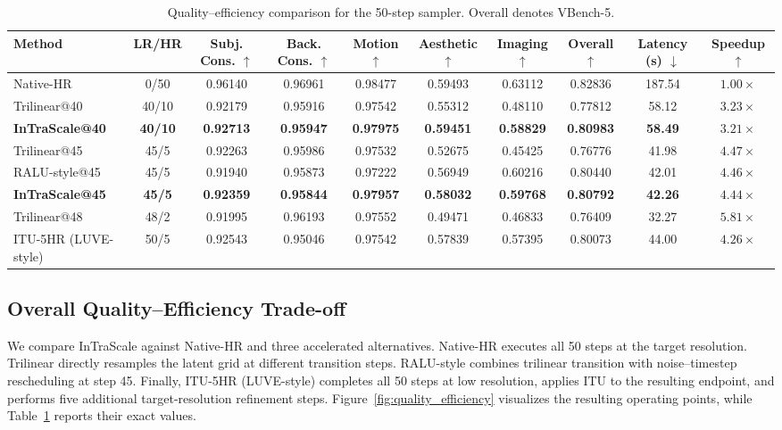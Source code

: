 \documentclass[letterpaper]{article} %
\begin{document}
\begin{table}[t]
  \centering
  \small
  \setlength{\tabcolsep}{1.0pt}
  \renewcommand{\arraystretch}{1.0}
  \begin{tabular}{@{}lccccccccc@{}}
    \toprule
    Method & LR/HR & Subj. Cons. \(\uparrow\) & Back. Cons. \(\uparrow\) &
    Motion \(\uparrow\) & Aesthetic \(\uparrow\) & Imaging \(\uparrow\) &
    Overall \(\uparrow\) & Latency (s) \(\downarrow\) & Speedup \(\uparrow\) \\
    \midrule
    Native-HR & 0/50 & 0.96140 & 0.96961 & 0.98477 & 0.59493 &
    0.63112 & 0.82836 & 187.54 & \(1.00\times\) \\
    Trilinear@40 & 40/10 & 0.92179 & 0.95916 & 0.97542 & 0.55312 &
    0.48110 & 0.77812 & 58.12 & \(3.23\times\) \\
    \textbf{InTraScale@40} & \textbf{40/10} & \textbf{0.92713} &
    \textbf{0.95947} & \textbf{0.97975} & \textbf{0.59451} &
    \textbf{0.58829} & \textbf{0.80983} & \textbf{58.49} &
    \(\mathbf{3.21\times}\) \\
    Trilinear@45 & 45/5 & 0.92263 & 0.95986 & 0.97532 & 0.52675 &
    0.45425 & 0.76776 & 41.98 & \(4.47\times\) \\
    RALU-style@45 & 45/5 & 0.91940 & 0.95873 & 0.97222 & 0.56949 &
    0.60216 & 0.80440 & 42.01 & \(4.46\times\) \\
    \textbf{InTraScale@45} & \textbf{45/5} & \textbf{0.92359} &
    \textbf{0.95844} & \textbf{0.97957} & \textbf{0.58032} &
    \textbf{0.59768} & \textbf{0.80792} & \textbf{42.26} &
    \(\mathbf{4.44\times}\) \\
    Trilinear@48 & 48/2 & 0.91995 & 0.96193 & 0.97552 & 0.49471 &
    0.46833 & 0.76409 & 32.27 & \(5.81\times\) \\
    ITU-5HR (LUVE-style) & 50/5 & 0.92543 & 0.95046 & 0.97542 &
    0.57839 & 0.57395 & 0.80073 & 44.00 & \(4.26\times\) \\
    \bottomrule
  \end{tabular}
  \caption{Quality--efficiency comparison for the 50-step sampler. Overall denotes VBench-5.}
  \label{tab:wan50_quality_efficiency}
\end{table}

\subsection{Overall Quality--Efficiency Trade-off}
\label{sec:quality_efficiency}

We compare InTraScale against Native-HR and three accelerated alternatives.
Native-HR executes all 50 steps at the target resolution. Trilinear
directly resamples the latent grid at different transition steps. RALU-style
combines trilinear transition with noise--timestep rescheduling at step
45. Finally, ITU-5HR (LUVE-style) completes all 50 steps at low
resolution, applies ITU to the resulting endpoint, and performs five
additional target-resolution refinement steps.
Figure~\ref{fig:quality_efficiency} visualizes the resulting operating points,
while Table~\ref{tab:wan50_quality_efficiency} reports their exact values.
\end{document}
